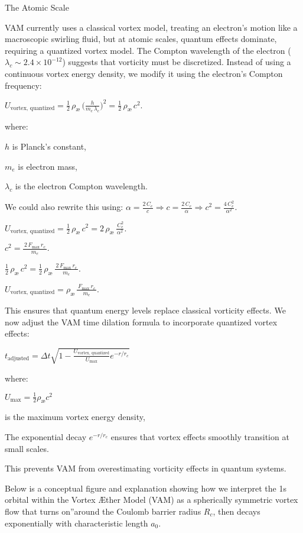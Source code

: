 The Atomic Scale

VAM currently uses a classical vortex model, treating an electron's motion like a macroscopic swirling fluid, but at atomic scales, quantum effects dominate, requiring a quantized vortex model. The Compton wavelength of the electron ($\lambda_c \sim 2.4 \times 10^{-12}$) suggests that vorticity must be discretized. Instead of using a continuous vortex energy density, we modify it using the electron's Compton frequency:

$U_\text{vortex, quantized}= \tfrac12\,\rho_\text{\ae}\,\bigl(\tfrac{h}{m_e\,\lambda_c}\bigr)^2= \tfrac12\,\rho_\text{\ae}\,c^2.$

where:

$h$ is Planck's constant,

$m_e$ is electron mass,

$\lambda_c$ is the electron Compton wavelength.

We could also rewrite this using: 
$\alpha= \tfrac{2\,C_e}{c}\Rightarrow c= \tfrac{2\,C_e}{\alpha}\Rightarrow c^2= \tfrac{4\,C_e^{2}}{\alpha^{2}}.$

$U_\text{vortex, quantized}= \tfrac12\,\rho_\text{\ae}\,c^2= 2\,\rho_\text{\ae}\,\frac{\,C_e^{2}}{\alpha^{2}}.$

$c^2= \frac{\,2\,F_{\max}\,r_c\,}{\,m_{e}\,}.$

$ \tfrac12\,\rho_\text{\ae}\,c^2= \tfrac12\,\rho_\text{\ae}\,\frac{\,2\,F_{\max}\,r_c\,}{\,m_{e}\,}.$

$U_\text{vortex, quantized}= \rho_\text{\ae}\,\frac{\,F_{\max}\,r_c\,}{\,m_{e}\,}.$

This ensures that quantum energy levels replace classical vorticity effects. We now adjust the VAM time dilation formula to incorporate quantized vortex effects:

$\boxed{t_\text{adjusted} = \Delta t \sqrt{1 - \frac{U_\text{vortex, quantized}}{U_\text{max}} e^{-r/r_c}}}$

where:

$U_\text{max} = \frac{1}{2} \rho_\text{\ae} c^2$

is the maximum vortex energy density,

The exponential decay $e^{-r/r_c}$ ensures that vortex effects smoothly transition at small scales.

This prevents VAM from overestimating vorticity effects in quantum systems.

Below is a conceptual figure and explanation showing how we interpret the 1s orbital within the Vortex Æther Model (VAM) as a spherically symmetric vortex flow that \grqq turns on\textquotedblright around the Coulomb barrier radius \(R_c\), then decays exponentially with characteristic length \(a_0\).





